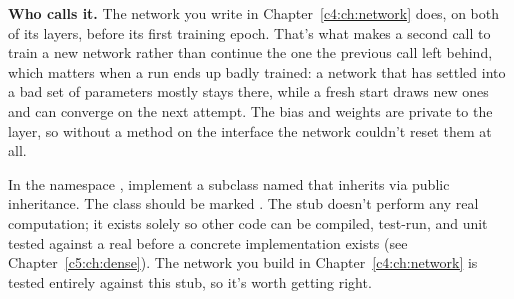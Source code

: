 \textbf{Who calls it.} The network you write in Chapter~\ref{c4:ch:network} does, on both of its
layers, before its first training epoch. That's what makes a second call to  train a
new network rather than continue the one the previous call left behind, which matters when a run
ends up badly trained: a network that has settled into a bad set of parameters mostly stays there,
while a fresh start draws new ones and can converge on the next attempt. The bias and weights are
private to the layer, so without a method on the interface the network couldn't reset them at all.

In the namespace , implement a subclass named  that inherits
 via public inheritance. The class should be marked . The stub doesn't
perform any real computation; it exists solely so other code can be compiled, test-run, and unit
tested against a real  before a concrete  implementation
exists (see Chapter~\ref{c5:ch:dense}). The network you build in Chapter~\ref{c4:ch:network} is
tested entirely against this stub, so it's worth getting right.
